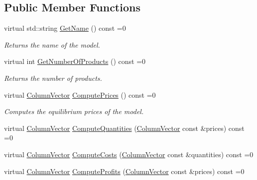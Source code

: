 \subsection*{Public Member Functions}
\begin{DoxyCompactItemize}
\item 
\mbox{\label{classModelInterface_ad2d37b05bed8ef0663a4e75221c31e7d}} 
virtual std\+::string \hyperlink{classModelInterface_ad2d37b05bed8ef0663a4e75221c31e7d}{Get\+Name} () const =0
\begin{DoxyCompactList}\small\item\em Returns the name of the model. \end{DoxyCompactList}\item 
\mbox{\label{classModelInterface_abb173c60dc16ba8b0e087f8edbbeb5b9}} 
virtual int \hyperlink{classModelInterface_abb173c60dc16ba8b0e087f8edbbeb5b9}{Get\+Number\+Of\+Products} () const =0
\begin{DoxyCompactList}\small\item\em Returns the number of products. \end{DoxyCompactList}\item 
\mbox{\label{classModelInterface_adc2c55b551054c0a98869bc0497919a8}} 
virtual \hyperlink{classColumnVector}{Column\+Vector} \hyperlink{classModelInterface_adc2c55b551054c0a98869bc0497919a8}{Compute\+Prices} () const =0
\begin{DoxyCompactList}\small\item\em Computes the equilibrium prices of the model. \end{DoxyCompactList}\item 
virtual \hyperlink{classColumnVector}{Column\+Vector} \hyperlink{classModelInterface_af9a936f6f0d1b1f0f2c5bf35785e7db4}{Compute\+Quantities} (\hyperlink{classColumnVector}{Column\+Vector} const \&prices) const =0
\item 
virtual \hyperlink{classColumnVector}{Column\+Vector} \hyperlink{classModelInterface_ac0a7cc3db9fc177dc75f16abf00275a7}{Compute\+Costs} (\hyperlink{classColumnVector}{Column\+Vector} const \&quantities) const =0
\item 
virtual \hyperlink{classColumnVector}{Column\+Vector} \hyperlink{classModelInterface_a311a000060cece8fc1058cd27bf07864}{Compute\+Profits} (\hyperlink{classColumnVector}{Column\+Vector} const \&prices) const =0

\end{DoxyCompactItemize}
